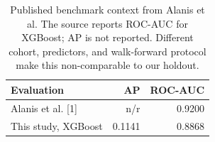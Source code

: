 \begin{table}[t]
\centering
\caption{Published benchmark context from Alanis et al. The source reports ROC-AUC for XGBoost; AP is not reported. Different cohort, predictors, and walk-forward protocol make this non-comparable to our holdout.}
\label{tab:published}
\footnotesize
\begin{tabular}{lrr}
\toprule
Evaluation & AP & ROC-AUC \\
\midrule
Alanis et al. [1] & n/r & 0.9200 \\
This study, XGBoost & 0.1141 & 0.8868 \\
\bottomrule
\end{tabular}
\end{table}

